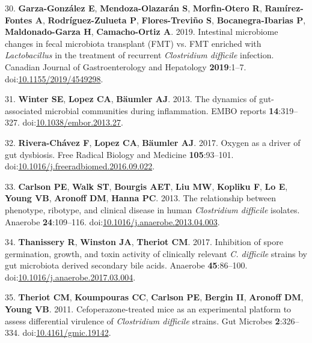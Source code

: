 \documentclass[11pt,]{article}
\newlength{\cslhangindent}
\newenvironment{cslreferences}%
  {\setlength{\parindent}{0pt}%
  \everypar{\setlength{\hangindent}{\cslhangindent}}\ignorespaces}%
  {\par}
\begin{document}
\begin{cslreferences}
\leavevmode\hypertarget{ref-garzagonzlez2019}{}%
30. \textbf{Garza-González E}, \textbf{Mendoza-Olazarán S},
\textbf{Morfin-Otero R}, \textbf{Ramírez-Fontes A},
\textbf{Rodríguez-Zulueta P}, \textbf{Flores-Treviño S},
\textbf{Bocanegra-Ibarias P}, \textbf{Maldonado-Garza H},
\textbf{Camacho-Ortiz A}. 2019. Intestinal microbiome changes in fecal
microbiota transplant (FMT) vs. FMT enriched with \emph{Lactobacillus}
in the treatment of recurrent \emph{Clostridium difficile} infection.
Canadian Journal of Gastroenterology and Hepatology \textbf{2019}:1--7.
doi:\href{https://doi.org/10.1155/2019/4549298}{10.1155/2019/4549298}.

\leavevmode\hypertarget{ref-winter2013}{}%
31. \textbf{Winter SE}, \textbf{Lopez CA}, \textbf{Bäumler AJ}. 2013.
The dynamics of gut-associated microbial communities during
inflammation. EMBO reports \textbf{14}:319--327.
doi:\href{https://doi.org/10.1038/embor.2013.27}{10.1038/embor.2013.27}.

\leavevmode\hypertarget{ref-riverachavez2017}{}%
32. \textbf{Rivera-Chávez F}, \textbf{Lopez CA}, \textbf{Bäumler AJ}.
2017. Oxygen as a driver of gut dysbiosis. Free Radical Biology and
Medicine \textbf{105}:93--101.
doi:\href{https://doi.org/10.1016/j.freeradbiomed.2016.09.022}{10.1016/j.freeradbiomed.2016.09.022}.

\leavevmode\hypertarget{ref-carlson2013}{}%
33. \textbf{Carlson PE}, \textbf{Walk ST}, \textbf{Bourgis AET},
\textbf{Liu MW}, \textbf{Kopliku F}, \textbf{Lo E}, \textbf{Young VB},
\textbf{Aronoff DM}, \textbf{Hanna PC}. 2013. The relationship between
phenotype, ribotype, and clinical disease in human \emph{Clostridium
difficile} isolates. Anaerobe \textbf{24}:109--116.
doi:\href{https://doi.org/10.1016/j.anaerobe.2013.04.003}{10.1016/j.anaerobe.2013.04.003}.

\leavevmode\hypertarget{ref-thanissery2017}{}%
34. \textbf{Thanissery R}, \textbf{Winston JA}, \textbf{Theriot CM}.
2017. Inhibition of spore germination, growth, and toxin activity of
clinically relevant \emph{C. difficile} strains by gut microbiota
derived secondary bile acids. Anaerobe \textbf{45}:86--100.
doi:\href{https://doi.org/10.1016/j.anaerobe.2017.03.004}{10.1016/j.anaerobe.2017.03.004}.

\leavevmode\hypertarget{ref-theriot2011}{}%
35. \textbf{Theriot CM}, \textbf{Koumpouras CC}, \textbf{Carlson PE},
\textbf{Bergin II}, \textbf{Aronoff DM}, \textbf{Young VB}. 2011.
Cefoperazone-treated mice as an experimental platform to assess
differential virulence of \emph{Clostridium difficile} strains. Gut
Microbes \textbf{2}:326--334.
doi:\href{https://doi.org/10.4161/gmic.19142}{10.4161/gmic.19142}.


\end{cslreferences}
\end{document}
